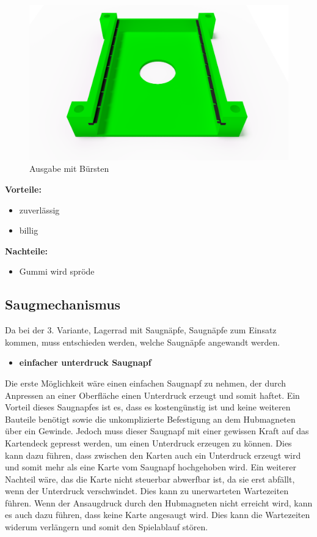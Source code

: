 \begin{figure}[H]
    \centering
    \includegraphics[scale=0.5,page=1]{fig/mech/AusgabeMitGummiabstreifer}
    \caption{Ausgabe mit Bürsten}
\end{figure}

\textbf{Vorteile:}
\begin{itemize}
    \item zuverlässig
    \item billig
\end{itemize}
\textbf{Nachteile:}
\begin{itemize}
    \item Gummi wird spröde
\end{itemize}

\subsection{Saugmechanismus}

Da bei der 3. Variante, Lagerrad mit Saugnäpfe, Saugnäpfe zum Einsatz kommen, muss entschieden werden, welche Saugnäpfe angewandt werden.

\begin{itemize}
    \item \textbf{einfacher unterdruck Saugnapf}
\end{itemize}
Die erste Möglichkeit wäre einen einfachen Saugnapf zu nehmen, der durch Anpressen an einer Oberfläche einen Unterdruck erzeugt und somit haftet. Ein Vorteil dieses Saugnapfes ist es, dass es kostengünstig ist und keine weiteren Bauteile benötigt sowie die
unkomplizierte Befestigung an dem Hubmagneten über ein Gewinde.
Jedoch muss dieser Saugnapf mit einer gewissen Kraft auf das Kartendeck gepresst werden, um einen Unterdruck erzeugen zu können. Dies kann dazu führen, dass zwischen den Karten auch ein Unterdruck erzeugt wird und somit mehr als eine Karte vom Saugnapf
hochgehoben wird. Ein weiterer Nachteil wäre, das die Karte nicht steuerbar abwerfbar ist, da sie erst abfällt, wenn der Unterdruck verschwindet. Dies kann zu unerwarteten Wartezeiten führen. Wenn der Ansaugdruck durch den Hubmagneten nicht erreicht wird, kann
es auch dazu führen, dass keine Karte angesaugt wird. Dies kann die Wartezeiten widerum verlängern und somit den Spielablauf stören.

